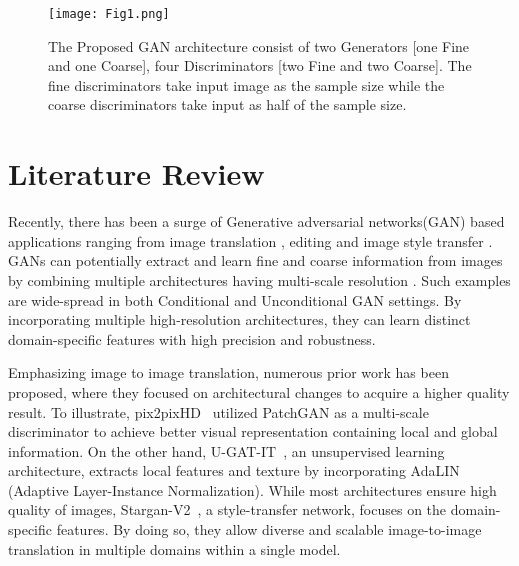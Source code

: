 \documentclass[a4paper,conference]{IEEEtran}
\begin{document}
\begin{figure*}[tp]
    \centering
    \texttt{[image: Fig1.png]}
    \caption{The Proposed GAN architecture consist of two Generators [one Fine and one Coarse], four Discriminators [two Fine and two Coarse]. The fine discriminators take input image as the sample size while the coarse discriminators take input as half of the sample size.}
    \label{fig1}
\end{figure*}

\section{Literature Review}






Recently, there has been a surge of Generative adversarial networks(GAN) based applications ranging from image translation \cite{chen2018sketchygan,sangkloy2017scribbler}, editing \cite{zhu2016generative,dekel2018sparse} and image style transfer \cite{wang2018high,xian2018texturegan}. GANs can potentially extract and learn fine and coarse information from images by combining multiple architectures having multi-scale resolution \cite{burt1983laplacian,brown2003recognising}.
Such examples are wide-spread in both Conditional \cite{huang2017stacked,denton2015deep} and Unconditional  GAN settings\cite{chen2017photographic,zhang2017stackgan}. By incorporating multiple high-resolution architectures, they can learn distinct domain-specific features with high precision and robustness.


Emphasizing image to image translation, numerous prior work has been proposed, where they focused on architectural changes to acquire a higher quality result. To illustrate, pix2pixHD~\cite{wang2018high} utilized  PatchGAN as a multi-scale discriminator to achieve better visual representation containing local and global information. On the other hand,  U-GAT-IT~\cite{kim2019u}, an unsupervised learning architecture, extracts local features and texture by incorporating AdaLIN (Adaptive Layer-Instance Normalization). While most architectures ensure high quality of images, Stargan-V2~\cite{choi2020stargan}, a style-transfer network, focuses on the domain-specific features. By doing so, they allow diverse and scalable image-to-image translation in multiple domains within a single model.
\end{document}
